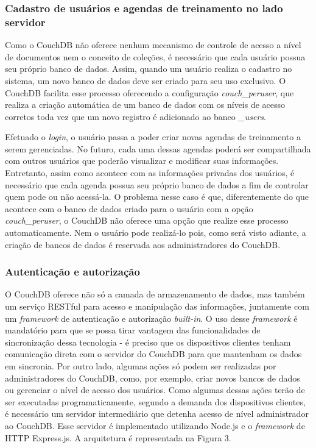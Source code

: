 \documentclass[
	article,			%
	12pt,				%
	oneside,			%
	a4paper,			%
	english,			%
	brazil,				%
	sumario=tradicional
	]{abntex2}
\begin{document}
\subsubsection{Cadastro de usuários e agendas de treinamento no lado servidor}

Como o CouchDB não oferece nenhum mecanismo de controle de acesso a nível de documentos nem o conceito de coleções, é necessário que cada usuário possua seu próprio banco de dados. Assim, quando um usuário realiza o cadastro no sistema, um novo banco de dados deve ser criado para seu uso exclusivo. O CouchDB facilita esse processo oferecendo a configuração \textit{couch\_peruser}, que realiza a criação automática de um banco de dados com os níveis de acesso corretos toda vez que um novo registro é adicionado ao banco \textit{\_users}.

Efetuado o \textit{login}, o usuário passa a poder criar novas agendas de treinamento a serem gerenciadas. No futuro, cada uma dessas agendas poderá ser compartilhada com outros usuários que poderão visualizar e modificar suas informações. Entretanto, assim como acontece com as informações privadas dos usuários, é necessário que cada agenda possua seu próprio banco de dados a fim de controlar quem pode ou não acessá-la. O problema nesse caso é que, diferentemente do que acontece com o banco de dados criado para o usuário com a opção \textit{couch\_peruser}, o CouchDB não oferece uma opção que realize esse processo automaticamente. Nem o usuário pode realizá-lo pois, como será visto adiante, a criação de bancos de dados é reservada aos administradores do CouchDB.

\subsubsection{Autenticação e autorização}

O CouchDB oferece não só a camada de armazenamento de dados, mas também um serviço RESTful para acesso e manipulação das informações, juntamente com um \textit{framework} de autenticação e autorização \textit{built-in}. O uso desse \textit{framework} é mandatório para que se possa tirar vantagem das funcionalidades de sincronização dessa tecnologia - é preciso que os dispositivos clientes tenham comunicação direta com o servidor  do CouchDB para que mantenham os dados em sincronia. Por outro lado, algumas ações só podem ser realizadas por administradores do CouchDB, como, por exemplo, criar novos bancos de dados ou gerenciar o nível de acesso dos usuários. Como algumas dessas ações terão de ser executadas programaticamente, segundo a demanda dos dispositivos clientes, é necessário um servidor intermediário que detenha acesso de nível administrador ao CouchDB. Esse servidor é implementado utilizando Node.js \cite{node-2017} e o \textit{framework} de HTTP Express.js. A arquitetura é representada na Figura 3.
\end{document}
